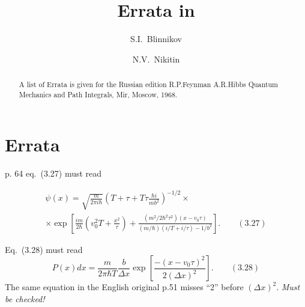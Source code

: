 \documentclass[%
onecolumn,%
oneside,%
floats,%
aps,%
 prd,%
nobibnotes,%
nofootinbib,%
amsmath,%
amssymb,%
amsfonts,%
amscd,%
  superscriptaddress,%
eqsecnum%
]{revtex4}
\begin{document}
\title{Errata in }

\author{S.I.~Blinnikov}

\author{N.V.~Nikitin}


\begin{abstract}
A list of Errata is given for the Russian edition R.P.Feynman A.R.Hibbs Quantum Mechanics and Path Integrals, Mir, Moscow, 1968.

\end{abstract}

\maketitle

\section{Errata}
\label{sec:errata}

p. 64 eq.~(3.27) must read

\begin{eqnarray*}
 \psi(x) =   \sqrt{\frac{m}{2\pi i \hbar}} \left(T + \tau + T \tau \frac{\hbar i}{m b^2}\right)^{-1/2} \times \\
 \times \exp\left[\frac{im}{2\hbar}\left(v_0^2T + \frac{x^2}{\tau} \right)
 + \frac{(m^2/2\hbar^2\tau^2)(x-v_0\tau)}{(m/\hbar)(i/T+i/\tau) - 1/b^2 } \right] .
 \qquad (3.27)
\end{eqnarray*}

Eq.~(3.28) must read
$$
P(x) dx = \frac{m}{2\pi \hbar T} \frac{b}{\Delta x}
           \exp\left[\frac{-(x-v_0\tau)^2}{2(\Delta x)^2}  \right] . \qquad (3.28)
$$
The same equation in the English original p.51 misses ``2'' before $(\Delta x)^2$. \textit{Must be checked!}
\end{document}
